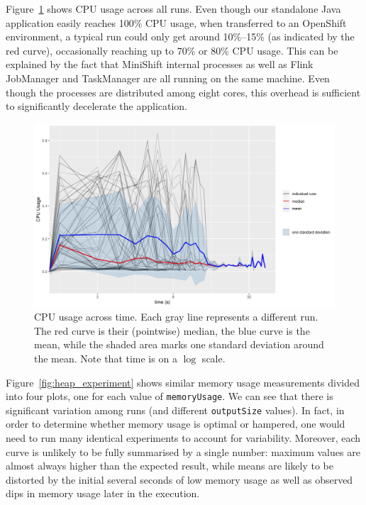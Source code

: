 \documentclass{article}
\begin{document}
Figure~\ref{fig:cpu_experiment} shows CPU usage across all runs. Even
though our standalone Java application easily reaches 100\% CPU usage, when
transferred to an OpenShift environment, a typical run could only get around
10\%--15\% (as indicated by the red curve), occasionally reaching up to 70\% or
80\% CPU usage. This can be explained by the fact that MiniShift internal
processes as well as Flink JobManager and TaskManager are all running on the
same machine. Even though the processes are distributed among eight cores, this
overhead is sufficient to significantly decelerate the application.

\begin{figure}
  \centering
  \includegraphics[width=\textwidth]{../plots/cpu_experiment.png}
  \caption{CPU usage across time. Each gray line represents a different run. The
  red curve is their (pointwise) median, the blue curve is the mean, while the
  shaded area marks one standard deviation around the mean. Note that time is on a
  $\log$ scale.}
  \label{fig:cpu_experiment}
\end{figure}

Figure~\ref{fig:heap_experiment} shows similar memory usage measurements divided
into four plots, one for each value of \texttt{memoryUsage}. We can see that
there is significant variation among runs (and different \texttt{outputSize}
values). In fact, in order to determine whether memory usage is optimal or
hampered, one would need to run many identical experiments to account for
variability. Moreover, each curve is unlikely to be fully summarised by a single
number: maximum values are almost always higher than the expected result, while
means are likely to be distorted by the initial several seconds of low memory
usage as well as observed dips in memory usage later in the execution.
\end{document}
